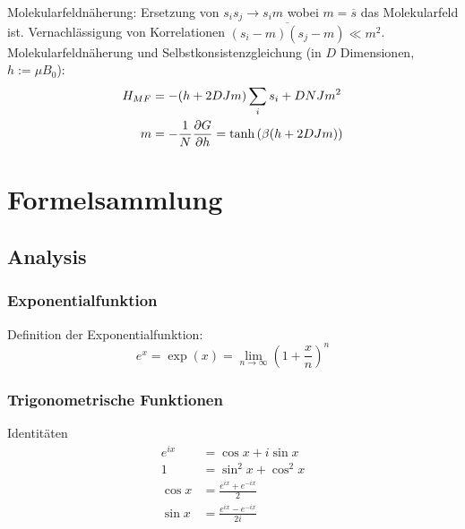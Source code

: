 \documentclass[11pt]{article}
\numberwithin{equation}{section}
\begin{document}
        Molekularfeldnäherung: Ersetzung von $s_i s_j \rightarrow s_i m$ wobei $m = \overline{s}$ das Molekularfeld ist. Vernachlässigung von Korrelationen $\overline{(s_i-m)(s_j-m)}\ll m^2$. \\
        Molekularfeldnäherung und Selbstkonsistenzgleichung (in $D$ Dimensionen, $h:=\mu B_0$):
        \begin{equation}
          \begin{aligned}
            H_{MF} &= -(h + 2 D J m) \sum_i s_i + D N J m^2 \\
            m &= -\frac{1}{N}\frac{\partial G}{\partial h} = \tanh\left({\beta(h + 2 D J m)}\right)
          \end{aligned}
        \end{equation}



  \newpage
	\section{Formelsammlung}
    \subsection{Analysis}
  	  \subsubsection{Exponentialfunktion}

  			Definition der Exponentialfunktion:
  			\begin{equation}
  				e^x=\exp{(x)}=\lim_{n\rightarrow \infty}\left(1+\frac{x}{n}\right)^n
  			\end{equation}

  		\subsubsection{Trigonometrische Funktionen}
  				Identitäten
  				\begin{equation}
  					\begin{split}
  						e^{i x}&=\cos x+i\sin x \\
  						1&=\sin^{2}x+\cos^{2}x \\
  						\cos{x}&=\frac{e^{i x}+e^{-i x}}{2} \\
  						\sin{ x}&=\frac{e^{i x}-e^{-i x}}{2i} \\
  					\end{split}
  				\end{equation}
\end{document}
